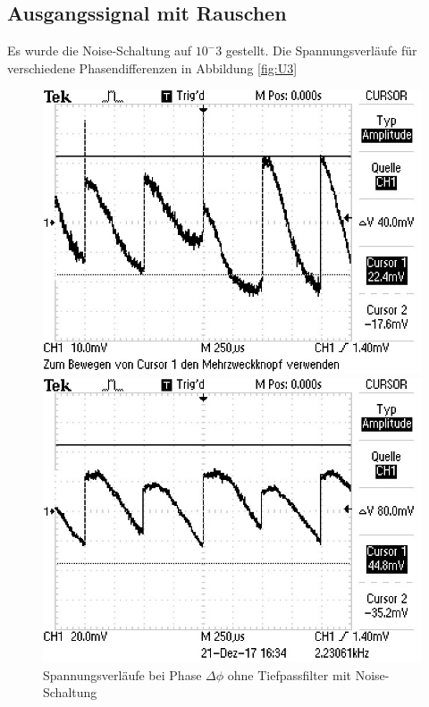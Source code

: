 \subsection{Ausgangssignal mit Rauschen}
Es wurde die Noise-Schaltung auf $10^-3$ gestellt. Die Spannungsverläufe für verschiedene Phasendifferenzen in Abbildung \ref{fig:U3}
\begin{figure}
\centering
\caption{Spannungsverläufe bei Phase $\Delta\phi$ ohne Tiefpassfilter mit Noise-Schaltung}
\begin{minipage}{0.48\textwidth}
\includegraphics[scale=0.6]{content/images/noise0.jpg}
\end{minipage}
\begin{minipage}{0.48\textwidth}
\includegraphics[scale=0.6]{content/images/noise45.jpg}

\end{minipage}
\end{figure}

